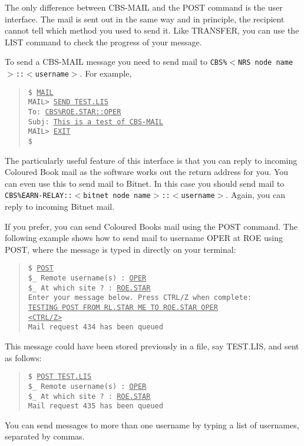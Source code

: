 The only difference between CBS-MAIL and the POST command is the user
interface. The mail is sent out in the same way and in principle, the recipient
cannot tell which method you used to send it. Like TRANSFER, you can use the
LIST command to check the progress of your message.

To send a CBS-MAIL message you need to send mail to
{\tt CBS\%$<$NRS node name$>$::$<$username$>$}.
For example,
\begin{quote}
{\tt \$ \underline{MAIL}\\[\medskipamount]
MAIL> \underline{SEND TEST.LIS}\\
To:     \underline{CBS\%ROE.STAR::OPER}\\
Subj:   \underline{This is a test of CBS-MAIL}\\[\medskipamount]
MAIL> \underline{EXIT}\\[\medskipamount]
\$}
\end{quote}
The particularly useful feature of this interface is that you can reply to
incoming Coloured Book mail as the software works out the return address for
you. You can even use this to send mail to Bitnet. In this case you should send
mail to {\tt CBS\%EARN-RELAY::$<$bitnet node name$>$::$<$username$>$}. Again,
you can reply to incoming Bitnet mail.

If you prefer, you can send Coloured Books mail using the POST command.
The following example shows how to send mail to username OPER at ROE using POST,
where the message is typed in directly on your terminal:
\begin{quote}
{\tt \$ \underline{POST}\\
\$\_ Remote username(s) : \underline{OPER}\\
\$\_ At which site ?    : \underline{ROE.STAR}\\
Enter your message below. Press CTRL/Z when complete:\\
\underline{TESTING POST FROM RL.STAR ME TO ROE.STAR OPER}\\
\underline{<CTRL/Z>}\\
Mail request 434 has been queued}
\end{quote}
This message could have been stored previously in a file, say TEST.LIS, and sent
as follows:
\begin{quote}
{\tt \$ \underline{POST TEST.LIS}\\
\$\_ Remote username(s) : \underline{OPER}\\
\$\_ At which site ?    : \underline{ROE.STAR}\\
Mail request 435 has been queued}
\end{quote}
You can send messages to more than one username by typing a list of usernames,
separated by commas.


